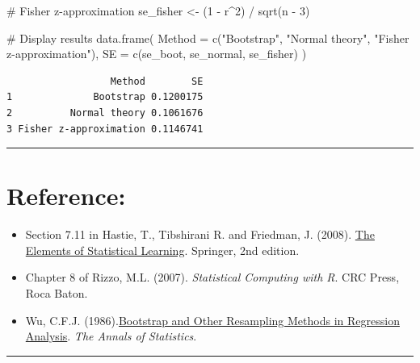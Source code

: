 \documentclass[
  letterpaper,
  DIV=11,
  numbers=noendperiod]{scrreprt}
\newenvironment{Shaded}{\begin{snugshade}}{\end{snugshade}}
\newcommand{\AttributeTok}[1]{\textcolor[rgb]{0.40,0.45,0.13}{#1}}
\newcommand{\CommentTok}[1]{\textcolor[rgb]{0.37,0.37,0.37}{#1}}
\newcommand{\DecValTok}[1]{\textcolor[rgb]{0.68,0.00,0.00}{#1}}
\newcommand{\FunctionTok}[1]{\textcolor[rgb]{0.28,0.35,0.67}{#1}}
\newcommand{\NormalTok}[1]{\textcolor[rgb]{0.00,0.23,0.31}{#1}}
\newcommand{\OtherTok}[1]{\textcolor[rgb]{0.00,0.23,0.31}{#1}}
\newcommand{\SpecialCharTok}[1]{\textcolor[rgb]{0.37,0.37,0.37}{#1}}
\newcommand{\StringTok}[1]{\textcolor[rgb]{0.13,0.47,0.30}{#1}}
\begin{document}
\begin{tcolorbox}
\begin{Shaded}
\begin{Highlighting}[]
\CommentTok{\# Fisher z{-}approximation}
\NormalTok{se\_fisher }\OtherTok{\textless{}{-}}\NormalTok{ (}\DecValTok{1} \SpecialCharTok{{-}}\NormalTok{ r}\SpecialCharTok{\^{}}\DecValTok{2}\NormalTok{) }\SpecialCharTok{/} \FunctionTok{sqrt}\NormalTok{(n }\SpecialCharTok{{-}} \DecValTok{3}\NormalTok{)}

\CommentTok{\# Display results}
\FunctionTok{data.frame}\NormalTok{(}
  \AttributeTok{Method =} \FunctionTok{c}\NormalTok{(}\StringTok{"Bootstrap"}\NormalTok{, }\StringTok{"Normal theory"}\NormalTok{, }\StringTok{"Fisher z{-}approximation"}\NormalTok{),}
  \AttributeTok{SE =} \FunctionTok{c}\NormalTok{(se\_boot, se\_normal, se\_fisher)}
\NormalTok{)}
\end{Highlighting}
\end{Shaded}

\begin{verbatim}
                  Method        SE
1              Bootstrap 0.1200175
2          Normal theory 0.1061676
3 Fisher z-approximation 0.1146741
\end{verbatim}

\begin{center}\rule{0.5\linewidth}{0.5pt}\end{center}

\section{Reference:}\label{reference}

\begin{itemize}
\item
  Section 7.11 in Hastie, T., Tibshirani R. and Friedman, J. (2008).
  \href{https://www.sas.upenn.edu/~fdiebold/NoHesitations/BookAdvanced.pdf}{The
  Elements of Statistical Learning}. Springer, 2nd edition.
\item
  Chapter 8 of Rizzo, M.L. (2007). \emph{Statistical Computing with R}.
  CRC Press, Roca Baton.
\item
  Wu, C.F.J.
  (1986).\href{https://projecteuclid.org/journals/annals-of-statistics/volume-14/issue-4/Jackknife-Bootstrap-and-Other-Resampling-Methods-in-Regression-Analysis/10.1214/aos/1176350142.full}{Bootstrap
  and Other Resampling Methods in Regression Analysis}. \emph{The Annals
  of Statistics}.
\end{itemize}

\begin{center}\rule{0.5\linewidth}{0.5pt}\end{center}


\end{tcolorbox}
\end{document}
